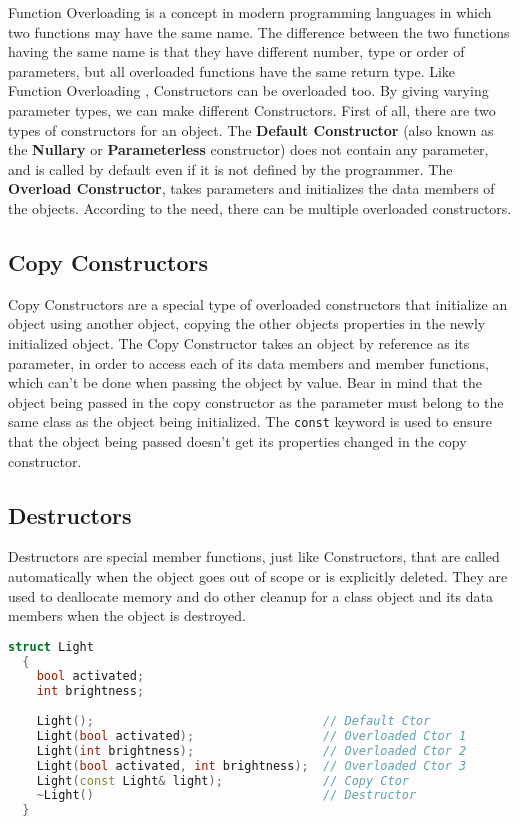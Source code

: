 \documentclass[11pt,fleqn]{book} %
\begin{document}
Function Overloading is a concept in modern programming languages in which two functions may have the same name. The difference between the two functions having the same name is that they have different number, type or order of parameters, but all overloaded functions have the same return type. Like Function Overloading , Constructors can be overloaded too. By giving varying parameter types, we can make different Constructors. First of all, there are two types of constructors for an object. The \textbf{Default Constructor} (also known as the \textbf{Nullary} or \textbf{Parameterless} constructor) does not contain any parameter, and is called by default even if it is not defined by the programmer. The \textbf{Overload Constructor}, takes parameters and initializes the data members of the objects. According to the need, there can be multiple overloaded constructors.

\subsection{Copy Constructors}

Copy Constructors are a special type of overloaded constructors that initialize an object using another object, copying the other objects properties in the newly initialized object. The Copy Constructor takes an object by reference as its parameter, in order to access each of its data members and member functions, which can't be done when passing the object by value. Bear in mind that the object being passed in the copy constructor as the parameter must belong to the same class as the object being initialized. The \texttt{const} keyword is used to ensure that the object being passed doesn't get its properties changed in the copy constructor.


\subsection{Destructors}

Destructors are special member functions, just like Constructors, that are called automatically when the object goes out of scope or is explicitly deleted. They are used to deallocate memory and do other cleanup for a class object and its data members when the object is destroyed.


\begin{lstlisting}[language=C++, caption={Declaration of Overloaded Constructors, Copy Constructor and Destructor}]
  struct Light
  {
    bool activated;
    int brightness;
    
    Light();                                // Default Ctor
    Light(bool activated);                  // Overloaded Ctor 1
    Light(int brightness);                  // Overloaded Ctor 2
    Light(bool activated, int brightness);  // Overloaded Ctor 3
    Light(const Light& light);              // Copy Ctor
    ~Light()                                // Destructor
  }
\end{lstlisting}
\end{document}
